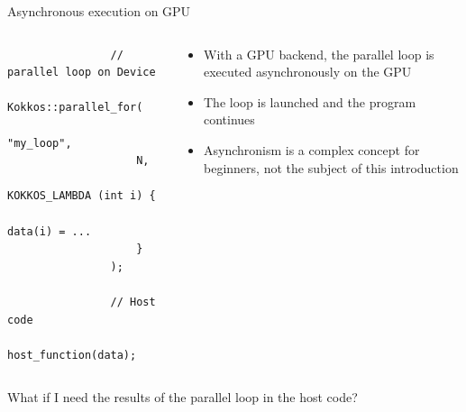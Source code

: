 \documentclass[aspectratio=169]{beamer}
\begin{document}
\begin{frame}[fragile]{Asynchronous execution on GPU}
    \begin{columns}
        \begin{column}{0.5\linewidth}
            \begin{verbatim}
                // parallel loop on Device
                Kokkos::parallel_for(
                    "my_loop",
                    N,
                    KOKKOS_LAMBDA (int i) {
                        data(i) = ...
                    }
                );

                // Host code
                host_function(data);
            \end{verbatim}
        \end{column}
        \begin{column}{0.5\linewidth}
            \begin{itemize}
                \item With a GPU backend, the parallel loop is executed asynchronously on the GPU
                \item The loop is launched and the program continues
                \item Asynchronism is a complex concept for beginners, not the subject of this introduction
            \end{itemize}
        \end{column}
    \end{columns}

    \vspace{1em}
     What if I need the results of the parallel loop in the host code?
\end{frame}

\end{document}
